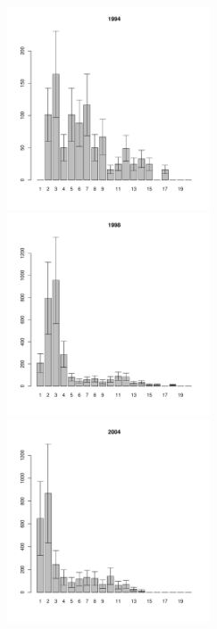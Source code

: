 \documentclass[12pt, a4paper]{article}
\begin{document}
\begin{figure}[h]
\begin{multicols}{3}
\hfill
\includegraphics[width=60mm]{../White_Sea/Luvenga_II_razrez/fucus_zone_1994_.pdf}
\hfill
\includegraphics[width=60mm]{../White_Sea/Luvenga_II_razrez/fucus_zone_1998_.pdf}
\hfill
\includegraphics[width=60mm]{../White_Sea/Luvenga_II_razrez/fucus_zone_2004_.pdf}
\end{multicols}



\end{figure}
\end{document}
